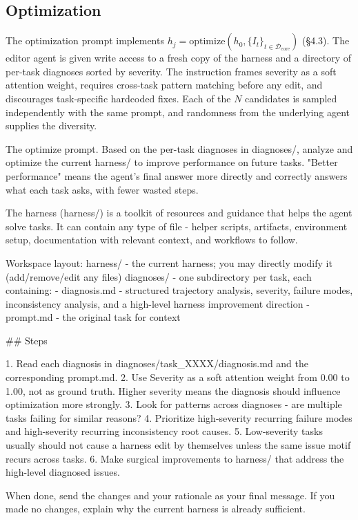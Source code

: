 \documentclass{llmxive}
\begin{document}
\subsection{Optimization}

The optimization prompt implements
$h_j = \mathrm{optimize}(h_0, \{I_t\}_{t \in \mathcal{D}_{\mathrm{core}}})$
(\S 4.3). The editor agent is given write access to a fresh copy of
the harness and a directory of per-task diagnoses sorted by severity.
The instruction frames severity as a soft attention weight, requires
cross-task pattern matching before any edit, and discourages
task-specific hardcoded fixes. Each of the $N$ candidates is sampled
independently with the same prompt, and randomness from the underlying
agent supplies the diversity.

\begin{promptbox}{The $\mathrm{optimize}$ prompt.}
Based on the per-task diagnoses in diagnoses/, analyze and optimize the current harness/ to improve performance on future tasks. "Better performance" means the agent's final answer more directly and correctly answers what each task asks, with fewer wasted steps.

The harness (harness/) is a toolkit of resources and guidance that helps the agent solve tasks. It can contain any type of file - helper scripts, artifacts, environment setup, documentation with relevant context, and workflows to follow.

Workspace layout:
  harness/       - the current harness; you may directly modify it (add/remove/edit any files)
  diagnoses/     - one subdirectory per task, each containing:
    - diagnosis.md  - structured trajectory analysis, severity, failure modes, inconsistency analysis, and a high-level harness improvement direction
    - prompt.md     - the original task for context

## Steps

1. Read each diagnosis in diagnoses/task_XXXX/diagnosis.md and the corresponding prompt.md.
2. Use Severity as a soft attention weight from 0.00 to 1.00, not as ground truth. Higher severity means the diagnosis should influence optimization more strongly.
3. Look for patterns across diagnoses - are multiple tasks failing for similar reasons?
4. Prioritize high-severity recurring failure modes and high-severity recurring inconsistency root causes.
5. Low-severity tasks usually should not cause a harness edit by themselves unless the same issue motif recurs across tasks.
6. Make surgical improvements to harness/ that address the high-level diagnosed issues.

When done, send the changes and your rationale as your final message. If you made no changes, explain why the current harness is already sufficient.
\end{promptbox}
\end{document}
